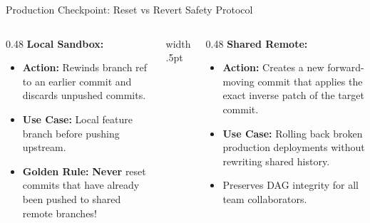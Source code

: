 \documentclass[../m00-session-04.tex]{subfiles}
\begin{document}
\begin{frame}[fragile]{Production Checkpoint: Reset vs Revert Safety Protocol}
  \begin{columns}[T,onlytextwidth]
    \begin{column}{0.48\textwidth}
      {\small\bfseries\color{UpGradRed}Local Sandbox: }\par\vspace{0.06cm}
      \begin{itemize}\setlength{\itemsep}{0.20em}\small
        \item \textbf{Action:} Rewinds branch ref to an earlier commit and discards unpushed commits.
        \item \textbf{Use Case:} Local feature branch before pushing upstream.
        \item \textcolor{UpGradRed}{\textbf{Golden Rule:}} \textbf{Never} reset commits that have already been pushed to shared remote branches!
      \end{itemize}
    \end{column}
    \hfill{\color{UpGradRule}\vrule width .5pt}\hfill
    \begin{column}{0.48\textwidth}
      {\small\bfseries\color{AWSEmerald}Shared Remote: }\par\vspace{0.06cm}
      \begin{itemize}\setlength{\itemsep}{0.20em}\small
        \item \textbf{Action:} Creates a new forward-moving commit that applies the exact inverse patch of the target commit.
        \item \textbf{Use Case:} Rolling back broken production deployments without rewriting shared history.
        \item Preserves DAG integrity for all team collaborators.
      \end{itemize}
      \vspace{0.04cm}
    \end{column}
  \end{columns}
\end{frame}
\end{document}
